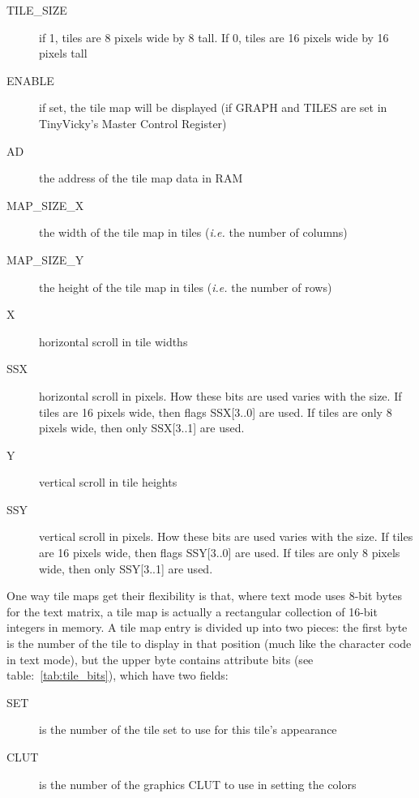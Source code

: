 \begin{description}
    \item[TILE\_SIZE] if 1, tiles are 8 pixels wide by 8 tall. If 0, tiles are 16 pixels wide by 16 pixels tall

    \item[ENABLE] if set, the tile map will be displayed (if GRAPH and TILES are set in TinyVicky's Master Control Register)

    \item[AD] the address of the tile map data in RAM

    \item[MAP\_SIZE\_X] the width of the tile map in tiles ({\it i.e.} the number of columns)

    \item[MAP\_SIZE\_Y] the height of the tile map in tiles ({\it i.e.} the number of rows)

    \item[X] horizontal scroll in tile widths

    \item[SSX] horizontal scroll in pixels. How these bits are used varies with the size. If tiles are 16 pixels wide, then flags SSX[3..0] are used. If tiles are only 8 pixels wide, then only SSX[3..1] are used.

    \item[Y] vertical scroll in tile heights

    \item[SSY] vertical scroll in pixels. How these bits are used varies with the size. If tiles are 16 pixels wide, then flags SSY[3..0] are used. If tiles are only 8 pixels wide, then only SSY[3..1] are used.
\end{description}

One way tile maps get their flexibility is that, where text mode uses 8-bit bytes for the text matrix, a tile map is actually a rectangular collection of 16-bit integers in memory. A tile map entry is divided up into two pieces: the first byte is the number of the tile to display in that position (much like the character code in text mode), but the upper byte contains attribute bits (see table:~\ref{tab:tile_bits}), which have two fields:

\begin{description}
    \item[SET] is the number of the tile set to use for this tile's appearance

    \item[CLUT] is the number of the graphics CLUT to use in setting the colors
\end{description}

